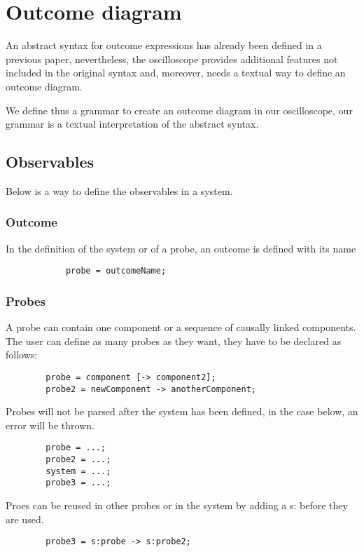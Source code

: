   \section{Outcome diagram}
        An abstract syntax for outcome expressions has already been defined in a previous paper, nevertheless, the oscilloscope provides additional features not included in the original syntax and, moreover, needs a textual way to define an outcome diagram. 
       
       We define thus a grammar to create an outcome diagram in our oscilloscope, our grammar is a textual interpretation of the abstract syntax. \\
        \subsection{Observables}
            Below is a way to define the observables in a system.
            \subsubsection{Outcome}
                In the definition of the system or of a probe, an outcome is defined with its name
        \begin{verbatim}
            probe = outcomeName;
        \end{verbatim}
            \subsubsection{Probes}
                
        A probe can contain one component or a sequence of causally linked components. \\
        The user can define as many probes as they want, they have to be declared as follows:
   \begin{verbatim}
        probe = component [-> component2];
        probe2 = newComponent -> anotherComponent;
   \end{verbatim}

    Probes will not be parsed after the system has been defined, in the case below, an error will be thrown.
    \begin{verbatim}
        probe = ...;
        probe2 = ...;
        system = ...;
        probe3 = ...;
    \end{verbatim}
    
    Proes can be reused in other probes or in the system by adding a s: before they are used.
    \begin{verbatim}
        probe3 = s:probe -> s:probe2;
    \end{verbatim}
 
